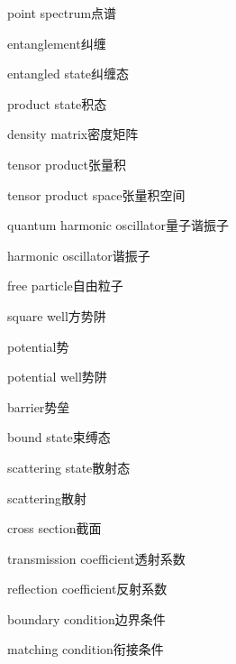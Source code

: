 \begin{multicols}{2}
point spectrum\hspace{0.9em}点谱\par
entanglement\hspace{0.9em}纠缠\par
entangled state\hspace{0.9em}纠缠态\par
product state\hspace{0.9em}积态\par
density matrix\hspace{0.9em}密度矩阵\par
tensor product\hspace{0.9em}张量积\par
tensor product space\hspace{0.9em}张量积空间\par
quantum harmonic oscillator\hspace{0.9em}量子谐振子\par
harmonic oscillator\hspace{0.9em}谐振子\par
free particle\hspace{0.9em}自由粒子\par
square well\hspace{0.9em}方势阱\par
potential\hspace{0.9em}势\par
potential well\hspace{0.9em}势阱\par
barrier\hspace{0.9em}势垒\par
bound state\hspace{0.9em}束缚态\par
scattering state\hspace{0.9em}散射态\par
scattering\hspace{0.9em}散射\par
cross section\hspace{0.9em}截面\par
transmission coefficient\hspace{0.9em}透射系数\par
reflection coefficient\hspace{0.9em}反射系数\par
boundary condition\hspace{0.9em}边界条件\par
matching condition\hspace{0.9em}衔接条件\par

\end{multicols}
